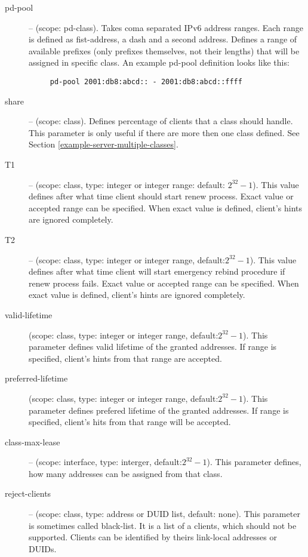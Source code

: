 \begin{description}
 \item[pd-pool] -- (scope: pd-class). Takes coma separated IPv6
   address ranges. Each range is defined as fist-address, a dash and a
   second address. Defines a range of available prefixes (only
   prefixes themselves, not their lengths) that will be assigned in
   specific class. An example pd-pool definition looks like this:
   \begin{lstlisting}
     pd-pool 2001:db8:abcd:: - 2001:db8:abcd::ffff
   \end{lstlisting}

\item[share] -- (scope: class). Defines percentage of clients that a
  class should handle. This parameter is only useful if there are more
  then one class defined. See Section
  \ref{example-server-multiple-classes}.

 \item[T1] -- (scope: class, type: integer or integer range: default:
   $2^{32}-1$). This value defines after what time client should start
   renew process. Exact value or accepted range can be specified. When
   exact value is defined, client's hints are ignored completely.

 \item[T2] -- (scope: class, type: integer or integer range,
   default:$2^{32}-1$). This value defines after what time client will
   start emergency rebind procedure if renew process fails. Exact
   value or accepted range can be specified. When exact value is
   defined, client's hints are ignored completely.

\item[valid-lifetime] (scope: class, type: integer or integer range,
            default:$2^{32}-1$). This parameter defines valid lifetime of
            the granted addresses. If range is specified, client's
            hints from that range are accepted.

\item[preferred-lifetime] (scope: class, type: integer or integer range,
            default:$2^{32}-1$). This parameter defines prefered
            lifetime of the granted addresses. If range is specified,
            client's hits from that range will be accepted.

\item[class-max-lease]  -- (scope: interface, type: interger,
            default:$2^{32}-1$). This parameter defines, how many
            addresses can be assigned from that class.

\item[reject-clients] -- (scope: class, type: address or DUID list,
            default: none). This parameter is sometimes called
            black-list. It is a list of a clients, which should not be
            supported. Clients can be identified by theirs link-local
            addresses or DUIDs.


\end{description}

